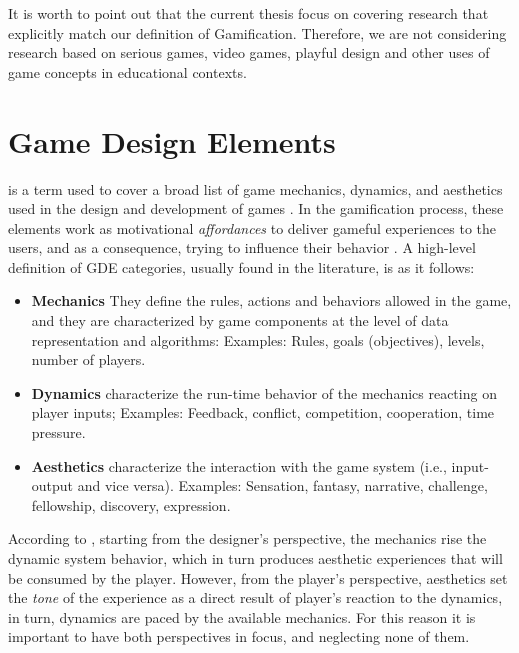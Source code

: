 It is worth to point out that the current thesis focus on covering
research that explicitly match our definition of Gamification.
Therefore, we are not considering research based on serious games,
video games, playful design and other uses of game concepts in
educational contexts.

\section{Game Design Elements}
\label{sec:Game_Design_Elements}

 is a term used to cover a broad list of game mechanics, dynamics, and aesthetics used in the design and development of games \cite{kapp2012gamification,Gamification_of_Collaborative_Learning}. In the gamification process, these elements work as motivational \textit{affordances} to deliver gameful experiences to the users, and as a consequence, trying to influence their behavior \cite{Does_Gamification_Work}. 
A high-level definition of GDE categories, usually found in the literature, is as it follows: 

\begin{itemize}
\item \textbf{Mechanics} They define the rules, actions and behaviors allowed in the game, and they are characterized by game components at the level of data representation and algorithms:
\subitem Examples: Rules, goals (objectives), levels, number of players. 
\item \textbf{Dynamics} characterize the run-time behavior of the mechanics reacting on player inputs;
\subitem Examples: Feedback, conflict, competition, cooperation, time pressure.
\item \textbf{Aesthetics} characterize the interaction with the game system (i.e., input-output and vice versa).
\subitem Examples: Sensation, fantasy, narrative, challenge, fellowship, discovery, expression.
\end{itemize}

According to \citeauthor{hunicke2004}, starting from the designer’s perspective,
the mechanics rise the dynamic system behavior, which in turn produces aesthetic experiences that will be consumed by the player.
However, from the player’s perspective, aesthetics set the \textit{tone} of the experience as a direct result of player's reaction to the dynamics, in turn, dynamics are paced by the available mechanics. For this reason it is important to have both perspectives in focus, and neglecting none of them.

